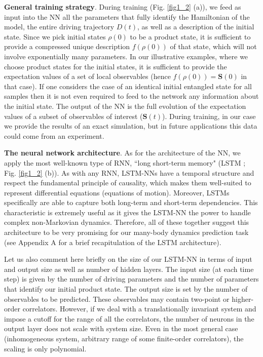 \documentclass[a4paper,aps,amsmath,amssymb,twocolumn,longbibliography,,accepted=2022-05-17]{quantumarticle}
\begin{document}
\textbf{General training strategy}. During training (Fig. \ref{fig1_2} (a)), we feed as input into the NN all the parameters that fully identify the Hamiltonian of the model, the entire driving trajectory $D(t)$, as well as a description of the initial state. Since we pick initial states $\rho(0)$ to be  a product state,   it is sufficient to provide a compressed unique description $f(\rho(0))$ of that state, which will not involve exponentially many parameters. In our illustrative examples, where we choose product states for the initial states, it is sufficient to provide the expectation values of a set of local observables (hence $f(\rho(0))=\boldsymbol{S}(0)$ in that case).   If one considers the case of an identical initial entangled state for all samples then it is not even required to feed to the network any information about the initial state.  The output of the NN is the full evolution of the expectation values of a subset of observables of interest ($\boldsymbol{S}(t)$). During training, in our case we provide the results of an exact simulation, but in future applications this data could come from an experiment.

\textbf{The neural network architecture}.
As for the architecture of the NN, we apply the most well-known type of RNN, ``long short-term memory" (LSTM \cite{hochreiter1735long}; Fig. \ref{fig1_2} (b)). As with any RNN, LSTM-NNs have a temporal structure and respect the fundamental principle of causality, which makes them well-suited to represent differential equations (equations of motion). Moreover, LSTMs specifically are able to capture both long-term and short-term dependencies. This characteristic is extremely useful as it gives the LSTM-NN the power to handle complex non-Markovian dynamics. Therefore, all of these together suggest this architecture to be very promising for our many-body dynamics prediction task (see Appendix  A for a brief recapitulation of the LSTM architecture).

Let us also comment here briefly on  the size of our LSTM-NN in terms of input and output size as well as number of hidden layers. The input size (at each time step) is  given by the number of driving  parameters  and  the number of parameters that identify our initial product state. The output size is set by the number of observables to be predicted. These observables may contain two-point or higher-order correlators. However, if we deal with a translationally invariant system and impose a cutoff for the range of all the correlators, the number of neurons in the output layer does not scale with system size. Even in the most general case (inhomogeneous system, arbitrary range of some finite-order correlators), the scaling is only polynomial.
\end{document}

